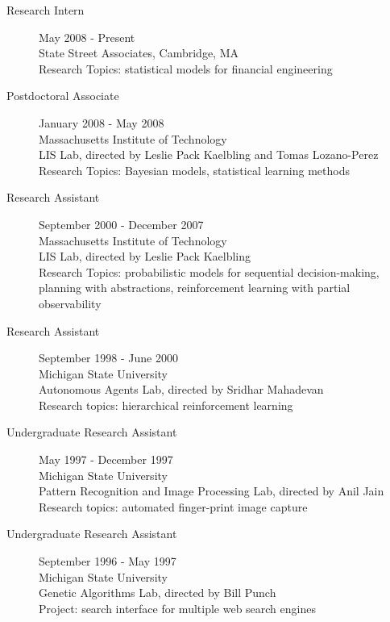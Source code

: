 \documentclass[overlapped,line,letterpaper]{res}
\begin{document}
\begin{resume}
\begin{description}
\item [Research Intern] \dotfill May 2008 - Present \\
State Street Associates, Cambridge, MA \\
Research Topics: statistical models for financial engineering
\item [Postdoctoral Associate] \dotfill January 2008 - May 2008 \\
Massachusetts Institute of Technology \\
LIS Lab, directed by Leslie Pack Kaelbling and Tomas Lozano-Perez \\
Research Topics: Bayesian models, statistical learning methods
\item [Research Assistant] \dotfill September 2000 - December 2007\\
Massachusetts Institute of Technology\\
LIS Lab, directed by Leslie Pack Kaelbling  \\
Research Topics: probabilistic models for sequential decision-making, planning with abstractions, reinforcement learning with partial observability
\item [Research Assistant] \dotfill September 1998 - June 2000\\
Michigan State University\\
Autonomous Agents Lab, directed by Sridhar Mahadevan\\
Research topics: hierarchical reinforcement learning
\item [Undergraduate Research Assistant] \dotfill May 1997 - December 1997 \\
Michigan State University\\
Pattern Recognition and Image Processing Lab, directed by Anil Jain \\
Research topics: automated finger-print image capture
\item [Undergraduate Research Assistant] \dotfill September 1996 - May 1997\\
Michigan State University\\
Genetic Algorithms Lab, directed by Bill Punch\\
 Project: search interface for multiple web search engines
\end{description}



\end{resume}
\end{document}
